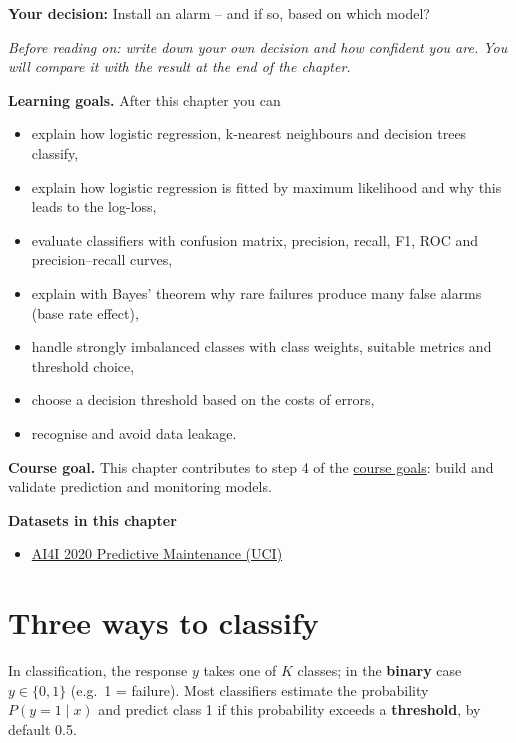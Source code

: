 \documentclass[
  letterpaper,
  DIV=11,
  numbers=noendperiod]{scrreprt}
\providecommand{\tightlist}{%
  \setlength{\itemsep}{0pt}\setlength{\parskip}{0pt}}\usepackage{longtable,booktabs,array}
\begin{document}
\textbf{Your decision:} Install an alarm -- and if so, based on which
model?

\emph{Before reading on: write down your own decision and how confident
you are. You will compare it with the result at the end of the chapter.}

\textbf{Learning goals.} After this chapter you can

\begin{itemize}
\tightlist
\item
  explain how logistic regression, k-nearest neighbours and decision
  trees classify,
\item
  explain how logistic regression is fitted by maximum likelihood and
  why this leads to the log-loss,
\item
  evaluate classifiers with confusion matrix, precision, recall, F1, ROC
  and precision--recall curves,
\item
  explain with Bayes' theorem why rare failures produce many false
  alarms (base rate effect),
\item
  handle strongly imbalanced classes with class weights, suitable
  metrics and threshold choice,
\item
  choose a decision threshold based on the costs of errors,
\item
  recognise and avoid data leakage.
\end{itemize}

\textbf{Course goal.} This chapter contributes to step 4 of the
\hyperref[what-you-will-be-able-to-do]{course goals}: build and validate
prediction and monitoring models.

\textbf{Datasets in this chapter}

\begin{itemize}
\tightlist
\item
  \href{https://archive.ics.uci.edu/dataset/601/ai4i+2020+predictive+maintenance+dataset}{AI4I
  2020 Predictive Maintenance (UCI)}
\end{itemize}

\section{Three ways to classify}\label{three-ways-to-classify}

In classification, the response \(y\) takes one of \(K\) classes; in the
\textbf{binary} case \(y \in \{0, 1\}\) (e.g.~1 = failure). Most
classifiers estimate the probability \(P(y = 1 \mid x)\) and predict
class 1 if this probability exceeds a \textbf{threshold}, by default
0.5.
\end{document}
